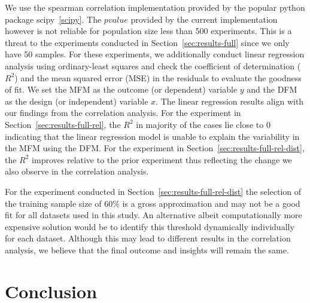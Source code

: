 \documentclass{article}
\begin{document}
We use the spearman correlation implementation provided by the popular
python package scipy \ref{scipy}. The $pvalue$ provided by the current
implementation however is not reliable for population size less than
500 experiments. This is a threat to the experiments conducted in
Section \ref{sec:results-full} since we only have 50 samples. For
these experiments, we additionally conduct linear regression analysis
using ordinary-least squares and check the coefficient of
determination ($R^2$) and the mean squared error (MSE) in the
residuals to evaluate the goodness of fit. We set the MFM as the
outcome (or dependent) variable $y$ and the DFM as the design (or
independent) variable $x$. The linear regression results align with
our findings from the correlation analysis. For the experiment in
Section \ref{sec:results-full-rel}, the $R^2$ in majority of the cases
lie close to 0 indicating that the linear regression model is unable
to explain the variability in the MFM using the DFM. For the
experiment in Section \ref{sec:results-full-rel-dist}, the $R^2$
improves relative to the prior experiment thus reflecting the change
we also observe in the correlation analysis.



For the experiment conducted in
Section \ref{sec:results-full-rel-dist} the selection of the training
sample size of 60\% is a gross approximation and may not be a good fit
for all datasets used in this study. An alternative albeit
computationally more expensive solution would be to identify this
threshold dynamically individually for each dataset. Although this may
lead to different results in the correlation analysis, we believe that
the final outcome and insights will remain the same.



\section{Conclusion}\label{sec:conclude}



\end{document}
